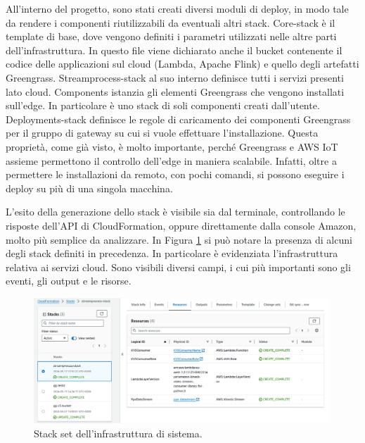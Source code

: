 All'interno del progetto, sono stati creati diversi moduli di deploy, in modo tale da rendere i componenti riutilizzabili da eventuali altri stack. Core-stack è il template di base, dove vengono definiti i parametri utilizzati nelle altre parti dell'infrastruttura. In questo file viene dichiarato anche il bucket contenente il codice delle applicazioni sul cloud (Lambda, Apache Flink) e quello degli artefatti Greengrass. Streamprocess-stack al suo interno definisce tutti i servizi presenti lato cloud. Components istanzia gli elementi Greengrass che vengono installati sull'edge. In particolare è uno stack di soli componenti creati dall’utente. Deployments-stack definisce le regole di caricamento dei componenti Greengrass per il gruppo di gateway su cui si vuole effettuare l'installazione. Questa proprietà, come già visto, è molto importante, perché Greengrass e AWS IoT assieme permettono il controllo dell'edge in maniera scalabile. Infatti, oltre a permettere le installazioni da remoto, con pochi comandi, si possono eseguire i deploy su più di una singola macchina. 

L'esito della generazione dello stack è visibile sia dal terminale, controllando le risposte dell'API di CloudFormation, oppure direttamente dalla console Amazon, molto più semplice da analizzare. In Figura \ref{fig:stack-set} si può notare la presenza di alcuni degli stack definiti in precedenza. In particolare è evidenziata l'infrastruttura relativa ai servizi cloud. Sono visibili diversi campi, i cui più importanti sono gli eventi, gli output e le risorse. 

\vspace{0.5cm}
\begin{figure}[htbp]
    \centering
    \includegraphics[width=0.99\textwidth]{figures/stack-set.png}
    \caption{Stack set dell'infrastruttura di sistema.} 
    \label{fig:stack-set}
\end{figure}


